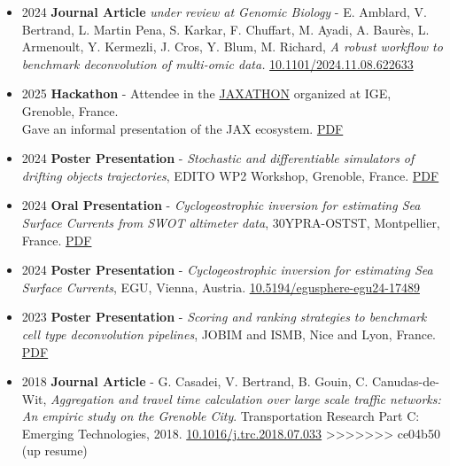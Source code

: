 \documentclass{article}
\begin{document}
\begin{itemize}
    \item[] 2024 \tabto{2cm} \textbf{Journal Article} \textit{under review at Genomic Biology} - E. Amblard, V. Bertrand, L. Martin Pena, S. Karkar, \tabto{2cm} F. Chuffart, M. Ayadi, A. Baurès, L. Armenoult, Y. Kermezli, J. Cros, Y. Blum, M. Richard, \textit{A robust \tabto{2cm} workflow to benchmark deconvolution of multi-omic data.} \href{https://doi.org/10.1101/2024.11.08.622633}{10.1101/2024.11.08.622633}

    \item[] 2025 \tabto{2cm} \textbf{Hackathon} - Attendee in the \href{https://github.com/Diff4Earth/ige-jaxathon-2025}{JAXATHON} organized at IGE, Grenoble, France. \\[.1 cm]
        \tabto{2cm} Gave an informal presentation of the JAX ecosystem. \href{https://vadmbertr.github.io/material/presentations/2025-03-jaxathon.pdf}{PDF}

    \item[] 2024 \tabto{2cm} \textbf{Poster Presentation} - \textit{Stochastic and differentiable simulators of drifting objects trajectories}, EDITO \tabto{2cm} WP2 Workshop, Grenoble, France. \href{https://vadmbertr.github.io/material/posters/2024-10_EDITO_Bertrand.pdf}{PDF}
    
    \item[] 2024 \tabto{2cm} \textbf{Oral Presentation} - \textit{Cyclogeostrophic inversion for estimating Sea Surface Currents from SWOT \tabto{2cm} altimeter data}, 30YPRA-OSTST, Montpellier, France. \href{https://vadmbertr.github.io/material/presentations/2.4-5-Bertrand.pdf}{PDF}
    
    \item[] 2024 \tabto{2cm} \textbf{Poster Presentation} - \textit{Cyclogeostrophic inversion for estimating Sea Surface Currents}, EGU, Vienna, \tabto{2cm} Austria. \href{https://doi.org/10.5194/egusphere-egu24-17489}{10.5194/egusphere-egu24-17489}
    
    \item[] 2023 \tabto{2cm} \textbf{Poster Presentation} - \textit{Scoring and ranking strategies to benchmark cell type deconvolution pipelines}, \tabto{2cm} JOBIM and ISMB, Nice and Lyon, France. \href{https://vadmbertr.github.io/material/posters/poster_jobim_ismb.pdf}{PDF}
    
    \item[] 2018 \tabto{2cm} \textbf{Journal Article} - G. Casadei, V. Bertrand, B. Gouin, C. Canudas-de-Wit, \textit{Aggregation and travel time \tabto{2cm} calculation over large scale traffic networks: An empiric study on the Grenoble City}. Transportation \tabto{2cm} Research Part C: Emerging Technologies, 2018. \href{https://doi.org/10.1016/j.trc.2018.07.033}{10.1016/j.trc.2018.07.033}
>>>>>>> ce04b50 (up resume)
\end{itemize}
\end{document}
